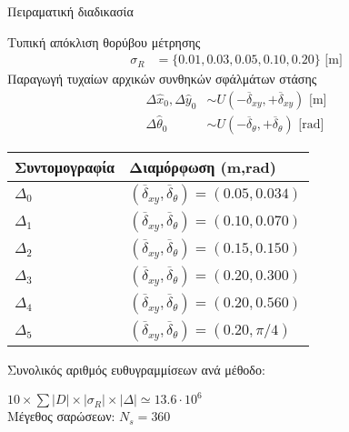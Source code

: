 \begin{frame}{Πειραματική διαδικασία}
{\begin{minipage}{\linewidth}
\begin{minipage}{0.56\linewidth}
\begin{bw_box}
        Τυπική απόκλιση θορύβου μέτρησης\vspace{-0.25cm}
      \begin{align}
        \sigma_R &= \{0.01, 0.03, 0.05, 0.10, 0.20\} \text{ [m]} \nonumber
      \end{align}
        Παραγωγή τυχαίων αρχικών συνθηκών σφάλμάτων στάσης\vspace{-0.25cm}
      \begin{align}
        \Delta \hat{x}_0,\Delta \hat{y}_0     &\sim U(-\overline{\delta}_{xy},+\overline{\delta}_{xy}) \text{ [m]} \nonumber \\
        \Delta\hat{\theta}_0 &\sim U(-\overline{\delta}_{\theta},+\overline{\delta}_{\theta} )  \text{ [rad]}\nonumber
      \end{align}
        \vspace{-0.8cm}
      \begin{table}\centering
        \begin{tabular}{ll}
        Συντομογραφία         & Διαμόρφωση (m,rad)                                                      \\  \toprule
        $\Delta_0$            & $(\overline{\delta}_{xy}, \overline{\delta}_{\theta}) = (0.05, 0.034)$  \\
        $\Delta_1$            & $(\overline{\delta}_{xy}, \overline{\delta}_{\theta}) = (0.10, 0.070)$  \\
        $\Delta_2$            & $(\overline{\delta}_{xy}, \overline{\delta}_{\theta}) = (0.15, 0.150)$  \\
        $\Delta_3$            & $(\overline{\delta}_{xy}, \overline{\delta}_{\theta}) = (0.20, 0.300)$  \\
        $\Delta_4$            & $(\overline{\delta}_{xy}, \overline{\delta}_{\theta}) = (0.20, 0.560)$  \\
        $\Delta_5$            & $(\overline{\delta}_{xy}, \overline{\delta}_{\theta}) = (0.20, \pi/4)$  \\  \bottomrule
        \end{tabular}
      \end{table}

      Συνολικός αριθμός ευθυγραμμίσεων ανά μέθοδο:

      $10 \times \sum |D| \times |\sigma_R| \times |\Delta| \simeq 13.6 \cdot 10^6$\\

      Μέγεθος σαρώσεων: $N_s = 360$\\


\end{bw_box}
\end{minipage}
\end{minipage}}
\end{frame}
